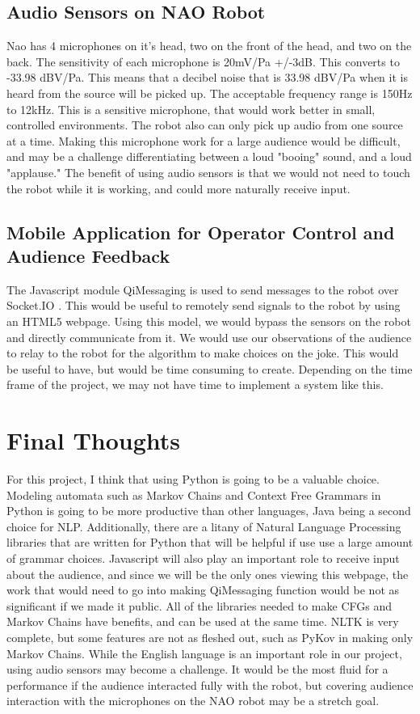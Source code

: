   \subsection{Audio Sensors on NAO Robot}
    Nao has 4 microphones on it's head, two on the front of the head, and two on the back. The sensitivity of each microphone is 20mV/Pa +/-3dB. This converts to -33.98 dBV/Pa. This means that a decibel noise that is 33.98 dBV/Pa when it is heard from the source will be picked up. The acceptable frequency range is 150Hz to 12kHz. This is a sensitive microphone, that would work better in small, controlled environments. The robot also can only pick up audio from one source at a time. Making this microphone work for a large audience would be difficult, and may be a challenge differentiating between a loud "booing" sound, and a loud "applause." The benefit of using audio sensors is that we would not need to touch the robot while it is working, and could more naturally receive input.
  \subsection{Mobile Application for Operator Control and Audience Feedback}

  The Javascript module QiMessaging \cite{qimessagingjavascript} is used to send messages to the robot over Socket.IO \cite{socketIO}. This would be useful to remotely send signals to the robot by using an HTML5 webpage. Using this model, we would bypass the sensors on the robot and directly communicate from it. We would use our observations of the audience to relay to the robot for the algorithm to make choices on the joke. This would be useful to have, but would be time consuming to create. Depending on the time frame of the project, we may not have time to implement a system like this.


\section{Final Thoughts}

  For this project, I think that using Python is going to be a valuable choice. Modeling automata such as Markov Chains and Context Free Grammars in Python is going to be more productive than other languages, Java being a second choice for NLP. Additionally, there are a litany of Natural Language Processing libraries that are written for Python that will be helpful if use use a large amount of grammar choices. Javascript will also play an important role to receive input about the audience, and since we will be the only ones viewing this webpage, the work that would need to go into making QiMessaging function would be not as significant if we made it public. All of the libraries needed to make CFGs and Markov Chains have benefits, and can be used at the same time. NLTK is very complete, but some features are not as fleshed out, such as PyKov in making only Markov Chains. While the English language is an important role in our project, using audio sensors may become a challenge. It would be the most fluid for a performance if the audience interacted fully with the robot, but covering audience interaction with the microphones on the NAO robot may be a stretch goal.
\pagebreak
